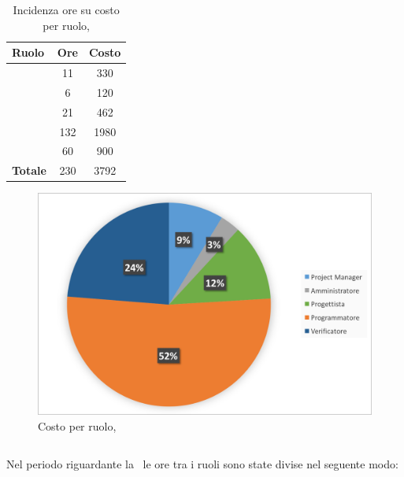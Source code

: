 \begin{table}[h]
	\begin{center}
		\begin{tabular}{|l|c|c|}
			\hline
			\textbf{Ruolo}	& \textbf{Ore} &	\textbf{Costo}	 \\
			\hline
			\textit{\Pm}	&	11	&	330		\\
			\hline
			\textit{\Am}	&	6	&	120		\\
			\hline
			\textit{\Prog}	&	21	&	462		\\
			\hline
			\textit{\Progr}	&	132	&	1980	\\
			\hline
			\textit{\Ver}	&	60	&	900	\\
			\hline
			\textbf{Totale}	&	230	&	3792	\\
			\hline
		\end{tabular}
	\end{center}
	\caption{Incidenza ore su costo per ruolo, \COD}
\end{table}

\begin{figure}[H]
	\centering 
	\includegraphics[scale=0.7]{Immagini/GraficiTorteSezione6/COD.png}
	\caption{Costo per ruolo, \COD}
\end{figure}

\newpage
\subsection{\VV}
Nel periodo riguardante la \VV\ le ore tra i ruoli sono state divise nel seguente modo:

